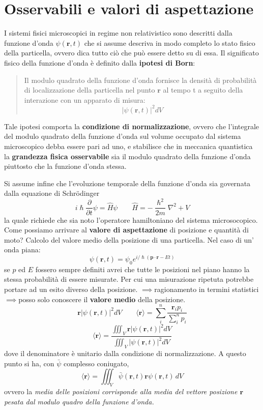
\section{Osservabili e valori di aspettazione}\label{sec:osservabili-e-valori-di-aspettazione}

I sistemi fisici microscopici in regime non relativistico sono descritti
dalla funzione d'onda \(\psi(\bm{r},t)\) che si assume descriva in modo
completo lo stato fisico della particella, ovvero dica tutto ciò che può
essere detto su di essa.
Il significato fisico della funzione d'onda è
definito dalla \textbf{ipotesi di Born}:
\begin{quote}
    Il modulo quadrato della funzione d'onda fornisce la densità di probabilità
    di localizzazione della particella nel punto \(\bm{r}\) al tempo t a seguito
    della interazione con un apparato di misura:
    \[
        | \psi(\bm{r},t)|^{2}dV
    \]
\end{quote}
Tale ipotesi comporta la \textbf{condizione di normalizzazione},
ovvero che l'integrale del modulo quadrato della funzione d'onda sul
volume occupato dal sistema microscopico debba essere pari ad uno, e
stabilisce che in meccanica quantistica la \textbf{grandezza fisica osservabile}
sia il modulo quadrato della funzione d'onda piuttosto che la funzione d'onda stessa.

Si assume infine che l'evoluzione temporale della funzione d'onda sia
governata dalla equazione di Schrödinger
\[
    i \hslash \frac{\partial}{\partial t} \psi = \hat{H} \psi \qquad \hat{H} = - \frac{\hslash^{2}}{2m} \nabla^{2} + V
\]
la quale richiede che sia noto l'operatore hamiltoniano del sistema microsocopico.
Come possiamo arrivare al \textbf{valore di aspettazione} di
posizione e quantità di moto?
Calcolo del valore medio della posizione
di una particella.
Nel caso di un' onda piana: \[
                                \psi(\bm{r},t) = \psi_{0} e^{ i/\hslash (\bm{p} \cdot \bm{r}-Et) }
\] se \(p\) ed \(E\) fossero sempre definiti avrei che tutte le
posizioni nel piano hanno la stessa probabilità di essere misurate.
Per
cui una misurazione ripetuta potrebbe portare ad un esito diverso della
posizione. \(\implies\)ragionamento in termini
statistici\(\implies\)posso solo conoscere il \textbf{valore medio}
della posizione. \[
                     \bm{r} |\psi(\bm{r},t)|^{2}dV \qquad \langle \bm{r} \rangle = \sum_{i}^{n} \frac{\bm{r}_{i}p_{i}}{\sum_{i}^{n}p_{i}}
\]
\begin{equation}
    \langle \bm{r} \rangle = \frac{\iiint_{V} \bm{r} |\psi(\bm{r},t)|^{2}dV }{\iiint_{V}|\psi(\bm{r},t)|^{2}dV }
    \label{eq:mean-value-quantum-position}
\end{equation} dove il denominatore è unitario dalla condizione di
normalizzazione.
A questo punto si ha, con \(\bar{\psi}\) complesso
coniugato, \[
               \langle \bm{r} \rangle = \iiint_{V} \bar{\psi}(\bm{r},t)\bm{r}\psi(\bm{r},t)\,dV
\] ovvero la \emph{media delle posizioni corrisponde alla media del
vettore posizione \(\bm{r}\) pesata dal modulo quadro della funzione
d'onda.}

